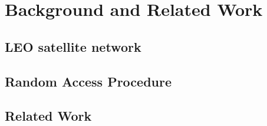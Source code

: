 \chapter{Background and Related Work}
\label{chap:background}


\section{LEO satellite network}

\section{Random Access Procedure}

\section{Related Work}
